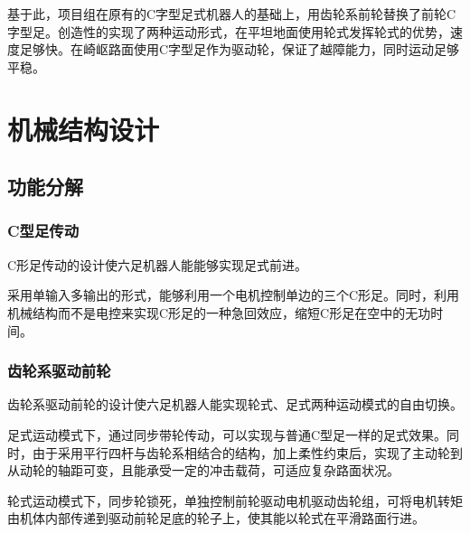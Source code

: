 \documentclass[12pt]{article}
\begin{document}
\begin{CJK}{UTF8}{song}
\par
基于此，项目组在原有的C字型足式机器人的基础上，用齿轮系前轮替换了前轮C字型足。创造性的实现了两种运动形式，在平坦地面使用轮式发挥轮式的优势，速度足够快。在崎岖路面使用C字型足作为驱动轮，保证了越障能力，同时运动足够平稳。


\section{机械结构设计}
\subsection{功能分解}
\subsubsection{C型足传动}
C形足传动的设计使六足机器人能能够实现足式前进。\par
采用单输入多输出的形式，能够利用一个电机控制单边的三个C形足。同时，利用机械结构而不是电控来实现C形足的一种急回效应，缩短C形足在空中的无功时间。
\subsubsection{齿轮系驱动前轮}
	齿轮系驱动前轮的设计使六足机器人能实现轮式、足式两种运动模式的自由切换。\par
	足式运动模式下，通过同步带轮传动，可以实现与普通C型足一样的足式效果。同时，由于采用平行四杆与齿轮系相结合的结构，加上柔性约束后，实现了主动轮到从动轮的轴距可变，且能承受一定的冲击载荷，可适应复杂路面状况。\par
	轮式运动模式下，同步轮锁死，单独控制前轮驱动电机驱动齿轮组，可将电机转矩由机体内部传递到驱动前轮足底的轮子上，使其能以轮式在平滑路面行进。
	

\end{CJK}
\end{document}
